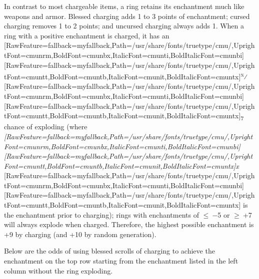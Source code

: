 In contrast to most chargeable items, a ring retains its enchantment much like weapons and armor. Blessed\footnotemark[108] charging adds 1 to 3 points of enchantment; cursed\footnotemark[109] charging removes 1 to 2 points; and uncursed\footnotemark[110] charging always adds 1. When a ring with a positive enchantment is charged, it has an \allowbreak{}\setmainfont{cmunrm.ttf}[RawFeature={fallback=myfallback},Path=/usr/share/fonts/truetype/cmu/,UprightFont=cmunrm,BoldFont=cmunbx,ItalicFont=cmunti,BoldItalicFont=cmunbi]\setmonofont{cmunrm.ttf}[RawFeature={fallback=myfallback},Path=/usr/share/fonts/truetype/cmu/,UprightFont=cmuntt,BoldFont=cmuntb,ItalicFont=cmunit,BoldItalicFont=cmuntx]\textsuperscript{x}⁄\allowbreak{}\setmainfont{cmunrm.ttf}[RawFeature={fallback=myfallback},Path=/usr/share/fonts/truetype/cmu/,UprightFont=cmunrm,BoldFont=cmunbx,ItalicFont=cmunti,BoldItalicFont=cmunbi]\setmonofont{cmunrm.ttf}[RawFeature={fallback=myfallback},Path=/usr/share/fonts/truetype/cmu/,UprightFont=cmuntt,BoldFont=cmuntb,ItalicFont=cmunit,BoldItalicFont=cmuntx]\textsubscript{7} chance of exploding\footnotemark[111] (where {\itshape \allowbreak{}\setmainfont{cmunti.ttf}[RawFeature={fallback=myfallback},Path=/usr/share/fonts/truetype/cmu/,UprightFont=cmunrm,BoldFont=cmunbx,ItalicFont=cmunti,BoldItalicFont=cmunbi]\setmonofont{cmunti.ttf}[RawFeature={fallback=myfallback},Path=/usr/share/fonts/truetype/cmu/,UprightFont=cmuntt,BoldFont=cmuntb,ItalicFont=cmunit,BoldItalicFont=cmuntx]\itshape x}{$\text{ }$}\allowbreak{}\setmainfont{cmunrm.ttf}[RawFeature={fallback=myfallback},Path=/usr/share/fonts/truetype/cmu/,UprightFont=cmunrm,BoldFont=cmunbx,ItalicFont=cmunti,BoldItalicFont=cmunbi]\setmonofont{cmunrm.ttf}[RawFeature={fallback=myfallback},Path=/usr/share/fonts/truetype/cmu/,UprightFont=cmuntt,BoldFont=cmuntb,ItalicFont=cmunit,BoldItalicFont=cmuntx] is the enchantment prior to charging); rings with enchantments of {\mbox{$\leq$}}{\mbox{$~$}}{\mbox{$-$}}5 or {\mbox{$\geq$}}{\mbox{$~$}}+7 will always explode when charged. Therefore, the highest possible enchantment is +9 by charging (and +10 by random generation).


Below are the odds of using blessed scrolls of charging to achieve the enchantment on the top row starting from the enchantment listed in the left column without the ring exploding.




